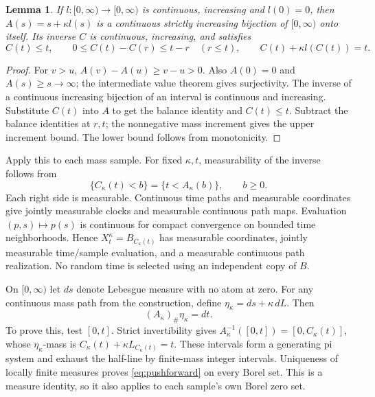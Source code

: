 \documentclass[11pt]{article}
\newtheorem{lemma}[theorem]{Lemma}
\begin{document}
\begin{lemma}\label{lem:inverse}
If $l:[0,\infty)\to[0,\infty)$ is continuous, increasing and
$l(0)=0$, then $A(s)=s+\kappa l(s)$ is a continuous strictly
increasing bijection of $[0,\infty)$ onto itself. Its inverse $C$
is continuous, increasing, and satisfies
\begin{equation}\label{eq:inverseproperties}
 C(t)\leq t,\qquad
 0\leq C(t)-C(r)\leq t-r\quad(r\leq t),\qquad
 C(t)+\kappa l(C(t))=t.
\end{equation}
\end{lemma}
\begin{proof}
For $v>u$, $A(v)-A(u)\geq v-u>0$. Also $A(0)=0$ and
$A(s)\geq s\to\infty$; the intermediate value theorem gives
surjectivity. The inverse of a continuous increasing bijection of an
interval is continuous and increasing. Substitute $C(t)$ into $A$
to get the balance identity and $C(t)\leq t$. Subtract the balance
identities at $r,t$; the nonnegative mass increment gives the upper
increment bound. The lower bound follows from monotonicity.
\end{proof}

Apply this to each mass sample. For fixed $\kappa,t$, measurability
of the inverse follows from
\begin{equation}\label{eq:inverseevent}
 \{C_\kappa(t)<b\}=\{t<A_\kappa(b)\},\qquad b\geq0.
\end{equation}
Each right side is measurable. Continuous time paths and measurable
coordinates give jointly measurable clocks and measurable continuous
path maps. Evaluation $(p,s)\mapsto p(s)$ is continuous for compact
convergence on bounded time neighborhoods. Hence
$X_t^\kappa=B_{C_\kappa(t)}$ has measurable coordinates, jointly
measurable time/sample evaluation, and a measurable continuous path
realization. No random time is selected using an independent copy of $B$.

On $[0,\infty)$ let $ds$ denote Lebesgue measure with no atom at
zero. For any continuous mass path from the construction, define
$\eta_\kappa=ds+\kappa\,dL$. Then
\begin{equation}\label{eq:pushforward}
 (A_\kappa)_\#\eta_\kappa=dt.
\end{equation}
To prove this, test $[0,t]$. Strict invertibility gives
$A_\kappa^{-1}([0,t])=[0,C_\kappa(t)]$, whose $\eta_\kappa$-mass
is $C_\kappa(t)+\kappa L_{C_\kappa(t)}=t$. These intervals form a
generating pi system and exhaust the half-line by finite-mass
integer intervals. Uniqueness of locally finite measures proves
\eqref{eq:pushforward} on every Borel set. This is a measure identity,
so it also applies to each sample's own Borel zero set.
\end{document}
